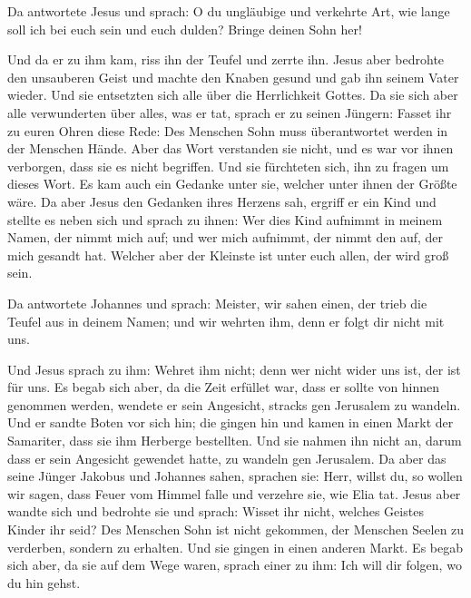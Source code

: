  Da antwortete Jesus und sprach: O du ungläubige und
verkehrte Art, wie lange soll ich bei euch sein und euch dulden? Bringe
deinen Sohn her!

 Und da er zu ihm kam, riss ihn der Teufel und zerrte
ihn. Jesus aber bedrohte den unsauberen Geist und machte den Knaben
gesund und gab ihn seinem Vater wieder.  Und sie
entsetzten sich alle über die Herrlichkeit Gottes. Da sie sich aber alle
verwunderten über alles, was er tat, sprach er zu seinen Jüngern:
 Fasset ihr zu euren Ohren diese Rede: Des Menschen Sohn
muss überantwortet werden in der Menschen Hände.  Aber
das Wort verstanden sie nicht, und es war vor ihnen verborgen, dass sie
es nicht begriffen. Und sie fürchteten sich, ihn zu fragen um dieses
Wort.  Es kam auch ein Gedanke unter sie, welcher unter
ihnen der Größte wäre.  Da aber Jesus den Gedanken ihres
Herzens sah, ergriff er ein Kind und stellte es neben sich
 und sprach zu ihnen: Wer dies Kind aufnimmt in meinem
Namen, der nimmt mich auf; und wer mich aufnimmt, der nimmt den auf, der
mich gesandt hat. Welcher aber der Kleinste ist unter euch allen, der
wird groß sein.

 Da antwortete Johannes und sprach: Meister, wir sahen
einen, der trieb die Teufel aus in deinem Namen; und wir wehrten ihm,
denn er folgt dir nicht mit uns.

 Und Jesus sprach zu ihm: Wehret ihm nicht; denn wer
nicht wider uns ist, der ist für uns.  Es begab sich
aber, da die Zeit erfüllet war, dass er sollte von hinnen genommen
werden, wendete er sein Angesicht, stracks gen Jerusalem zu wandeln.
 Und er sandte Boten vor sich hin; die gingen hin und
kamen in einen Markt der Samariter, dass sie ihm Herberge bestellten.
 Und sie nahmen ihn nicht an, darum dass er sein
Angesicht gewendet hatte, zu wandeln gen Jerusalem.  Da
aber das seine Jünger Jakobus und Johannes sahen, sprachen sie: Herr,
willst du, so wollen wir sagen, dass Feuer vom Himmel falle und verzehre
sie, wie Elia tat.  Jesus aber wandte sich und bedrohte
sie und sprach: Wisset ihr nicht, welches Geistes Kinder ihr seid?
 Des Menschen Sohn ist nicht gekommen, der Menschen
Seelen zu verderben, sondern zu erhalten.  Und sie gingen
in einen anderen Markt. Es begab sich aber, da sie auf dem Wege waren,
sprach einer zu ihm: Ich will dir folgen, wo du hin gehst.

